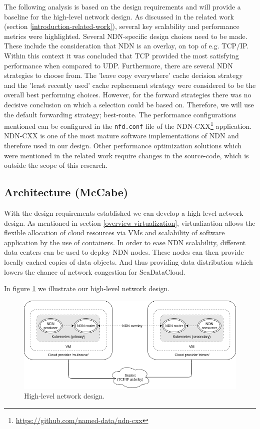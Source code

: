 The following analysis is based on the design requirements and will provide a baseline for the high-level network design. As discussed in the related work (section \ref{introduction-related-work}), several key scalability and performance metrics were highlighted. Several NDN-specific design choices need to be made. These include the consideration that NDN is an overlay, on top of e.g. TCP/IP. Within this context it was concluded that TCP provided the most satisfying performance when compared to UDP. Furthermore, there are several NDN strategies to choose from. The 'leave copy everywhere' cache decision strategy and the 'least recently used' cache replacement strategy were considered to be the overall best performing choices. However, for the forward strategies there was no decisive conclusion on which a selection could be based on. Therefore, we will use the default forwarding strategy; best-route. The performance configurations mentioned can be configured in the \texttt{nfd.conf} file of the NDN-CXX\footnote{\url{https://github.com/named-data/ndn-cxx}} application. NDN-CXX is one of the most mature software implementations of NDN and therefore used in our design. Other performance optimization solutions which were mentioned in the related work require changes in the source-code, which is outside the scope of this research.

\subsection{Architecture (McCabe)}
With the design requirements established we can develop a high-level network design. As mentioned in section \ref{overview-virtualization}, virtualization allows the flexible allocation of cloud resources via VMs and scalability of software application by the use of containers. In order to ease NDN scalability, different data centers can be used to deploy NDN nodes. These nodes can then provide locally cached copies of data objects. And thus providing data distribution which lowers the chance of network congestion for SeaDataCloud.

In figure \ref{fig:high-level-network-design} we illustrate our high-level network design. 

\begin{figure}[H]
\centering
\includegraphics[width=\columnwidth]{Images/high-level-network-design.png}
\caption{High-level network design.}
\label{fig:high-level-network-design}
\end{figure}



